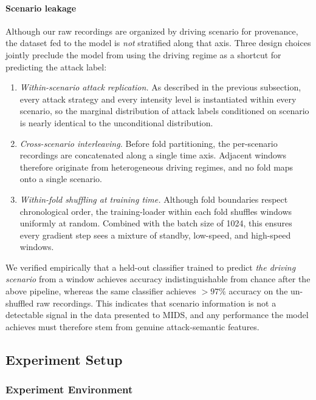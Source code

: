 \documentclass[lettersize,journal]{IEEEtran}
\begin{document}
\paragraph*{Scenario leakage}
Although our raw recordings are organized by driving scenario for 
provenance, the dataset fed to the model is \emph{not} stratified 
along that axis. Three design choices jointly preclude the model 
from using the driving regime as a shortcut for predicting the 
attack label:
\begin{enumerate}[leftmargin=*, nosep]
\item \emph{Within-scenario attack replication.} As described in 
the previous subsection, every attack strategy and every intensity 
level is instantiated within every scenario, so the marginal 
distribution of attack labels conditioned on scenario is nearly 
identical to the unconditional distribution.
\item \emph{Cross-scenario interleaving.} Before fold partitioning, 
the per-scenario recordings are concatenated along a single time 
axis. Adjacent windows therefore originate from heterogeneous driving 
regimes, and no fold maps onto a single scenario.
\item \emph{Within-fold shuffling at training time.} Although fold 
boundaries respect chronological order, the training-loader within 
each fold shuffles windows uniformly at random. Combined with the 
batch size of 1024, this ensures every gradient step sees a mixture 
of standby, low-speed, and high-speed windows.
\end{enumerate}

We verified empirically that a held-out classifier trained to predict 
\emph{the driving scenario} from a window achieves accuracy 
indistinguishable from chance after the above pipeline, whereas the 
same classifier achieves $>97\%$ accuracy on the un-shuffled raw 
recordings. This indicates that scenario information is not a 
detectable signal in the data presented to MIDS, and any performance 
the model achieves must therefore stem from genuine attack-semantic 
features.

\subsection{Experiment Setup}

\subsubsection{Experiment Environment}
\end{document}
